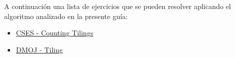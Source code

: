 A continuación una lista de ejercicios que se pueden resolver aplicando el algoritmo analizado en la presente guía:

\begin{itemize}
	\item \href{https://cses.fi/problemset/task/2181}{CSES - Counting Tilings}
	\item \href{https://dmoj.uclv.edu.cu/problem/campipvc}{DMOJ - Tiling}
\end{itemize}